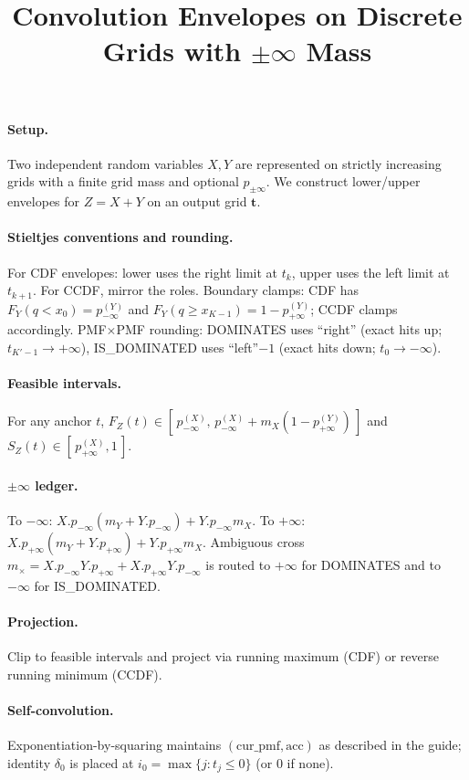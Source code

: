 \documentclass[11pt]{article}
\title{Convolution Envelopes on Discrete Grids with $\pm\infty$ Mass}
\author{}
\date{}
\begin{document}
\maketitle

\paragraph{Setup.}
Two independent random variables $X,Y$ are represented on strictly increasing grids
with a finite grid mass and optional $p_{\pm\infty}$. We construct lower/upper envelopes
for $Z=X+Y$ on an output grid $\mathbf{t}$.

\paragraph{Stieltjes conventions and rounding.}
For CDF envelopes: lower uses the right limit at $t_k$, upper uses the left limit at $t_{k+1}$.
For CCDF, mirror the roles. Boundary clamps: CDF has $F_Y(q<x_0) = p^{(Y)}_{-\infty}$ and
$F_Y(q\ge x_{K-1})=1-p^{(Y)}_{+\infty}$; CCDF clamps accordingly. PMF$\times$PMF rounding:
DOMINATES uses ``right'' (exact hits up; $t_{K'-1}\to +\infty$), IS\_DOMINATED uses
``left''$-1$ (exact hits down; $t_0\to -\infty$).

\paragraph{Feasible intervals.}
For any anchor $t$, $F_Z(t)\in[\,p^{(X)}_{-\infty},\,p^{(X)}_{-\infty}+m_X(1-p^{(Y)}_{+\infty})\,]$
and $S_Z(t)\in[\,p^{(X)}_{+\infty},1\,]$.

\paragraph{$\pm\infty$ ledger.}
To $-\infty$: $X.p_{-\infty}(m_Y+Y.p_{-\infty})+Y.p_{-\infty}m_X$.
To $+\infty$: $X.p_{+\infty}(m_Y+Y.p_{+\infty})+Y.p_{+\infty}m_X$.
Ambiguous cross $m_{\times}=X.p_{-\infty}Y.p_{+\infty}+X.p_{+\infty}Y.p_{-\infty}$
is routed to $+\infty$ for DOMINATES and to $-\infty$ for IS\_DOMINATED.

\paragraph{Projection.}
Clip to feasible intervals and project via running maximum (CDF) or reverse running minimum (CCDF).

\paragraph{Self-convolution.}
Exponentiation-by-squaring maintains $(\mathrm{cur\_pmf},\mathrm{acc})$ as described in the guide;
identity $\delta_0$ is placed at $i_0=\max\{j:t_j\le 0\}$ (or $0$ if none).
\end{document}
